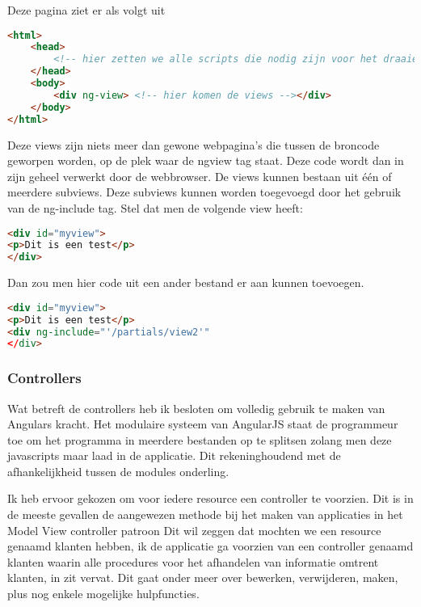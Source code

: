 \documentclass[a4paper,11pt]{article}
\begin{document}
Deze pagina ziet er als volgt uit
\begin{lstlisting}[language=html]
<html>
	<head>
		<!-- hier zetten we alle scripts die nodig zijn voor het draaien van de applicatie -->
	</head>
	<body>
		<div ng-view> <!-- hier komen de views --></div>
	</body>
</html>
\end{lstlisting}
Deze views zijn niets meer dan gewone webpagina's die tussen de broncode geworpen worden, op de plek waar de ngview tag staat. Deze code wordt dan in zijn geheel verwerkt door de webbrowser. De views kunnen bestaan uit één of meerdere subviews. Deze subviews kunnen worden toegevoegd door het gebruik van de ng-include tag. Stel dat men de volgende view heeft:
\begin{lstlisting}[language=html]
<div id="myview">
<p>Dit is een test</p>
</div>
\end{lstlisting}
Dan zou men hier code uit een ander bestand er aan kunnen toevoegen.
\begin{lstlisting}[language=html]
<div id="myview">
<p>Dit is een test</p>
<div ng-include="'/partials/view2'"
</div>
\end{lstlisting}

\subsubsection{Controllers}

Wat betreft de controllers heb ik besloten om volledig gebruik te maken van Angulars kracht. Het modulaire systeem van AngularJS staat de programmeur toe om het programma in meerdere bestanden op te splitsen zolang men deze javascripts maar laad in de applicatie. Dit rekeninghoudend met de afhankelijkheid tussen de modules onderling.

Ik heb ervoor gekozen om voor iedere resource een controller te voorzien. Dit is in de meeste gevallen de aangewezen methode bij het maken van applicaties in het Model View controller patroon %
Dit wil zeggen dat mochten we een resource genaamd klanten hebben, ik de applicatie ga voorzien van een controller genaamd klanten waarin alle procedures voor het afhandelen van informatie omtrent klanten, in zit vervat.  Dit gaat onder meer over bewerken, verwijderen, maken, plus nog enkele mogelijke hulpfuncties.
\end{document}
